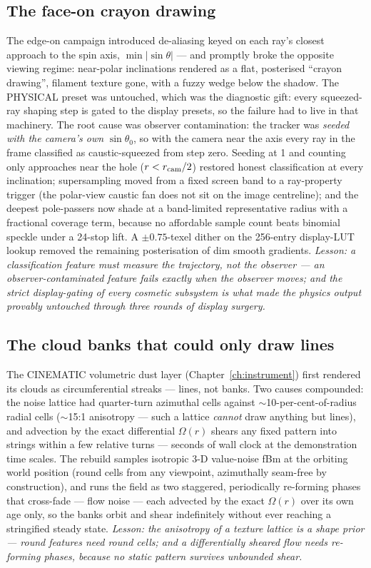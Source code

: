 \subsection{The face-on crayon drawing}
\label{sec:crayon}
The edge-on campaign introduced de-aliasing keyed on each ray's
closest approach to the spin axis, $\min|\sin\theta|$ — and promptly
broke the opposite viewing regime: near-polar inclinations rendered
as a flat, posterised ``crayon drawing'', filament texture gone,
with a fuzzy wedge below the shadow. The PHYSICAL preset was
untouched, which was the diagnostic gift: every squeezed-ray shaping
step is gated to the display presets, so the failure had to live in
that machinery. The root cause was observer contamination: the
tracker was \emph{seeded with the camera's own} $\sin\theta_0$, so
with the camera near the axis every ray in the frame classified as
caustic-squeezed from step zero. Seeding at 1 and counting only
approaches near the hole ($r < r_{\rm cam}/2$) restored honest
classification at every inclination; supersampling moved from a fixed
screen band to a ray-property trigger (the polar-view caustic fan
does not sit on the image centreline); and the deepest pole-passers
now shade at a band-limited representative radius with a fractional
coverage term, because no affordable sample count beats binomial
speckle under a 24-stop lift. A $\pm0.75$-texel dither on the
256-entry display-LUT lookup removed the remaining posterisation of
dim smooth gradients. \emph{Lesson: a classification feature must
measure the trajectory, not the observer — an observer-contaminated
feature fails exactly when the observer moves; and the strict
display-gating of every cosmetic subsystem is what made the physics
output provably untouched through three rounds of display surgery.}

\subsection{The cloud banks that could only draw lines}
\label{sec:cloudlines}
The CINEMATIC volumetric dust layer (Chapter~\ref{ch:instrument})
first rendered its clouds as circumferential streaks — lines, not
banks. Two causes compounded: the noise lattice had quarter-turn
azimuthal cells against $\sim$10-per-cent-of-radius radial cells
($\sim$15:1 anisotropy — such a lattice \emph{cannot} draw anything
but lines), and advection by the exact differential $\Omega(r)$
shears any fixed pattern into strings within a few relative turns —
seconds of wall clock at the demonstration time scales. The rebuild
samples isotropic 3-D value-noise fBm at the orbiting world position
(round cells from any viewpoint, azimuthally seam-free by
construction), and runs the field as two staggered, periodically
re-forming phases that cross-fade — flow noise — each advected by
the exact $\Omega(r)$ over its own age only, so the banks orbit and
shear indefinitely without ever reaching a stringified steady state.
\emph{Lesson: the anisotropy of a texture lattice is a shape prior —
round features need round cells; and a differentially sheared flow
needs re-forming phases, because no static pattern survives
unbounded shear.}

